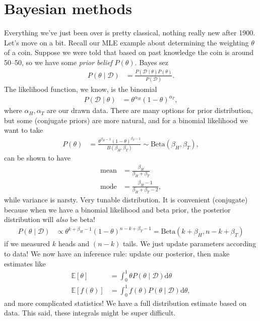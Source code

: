 \documentclass[11pt,letterpaper]{article}
\renewcommand{\d}{\mathrm{d}}
\theoremstyle{definition}
\theoremstyle{plain}
\numberwithin{equation}{section}
\numberwithin{figure}{section}
\begin{document}
\section{Bayesian methods}
Everything we've just been over is pretty classical, nothing really new after 1900. Let's move on a bit. Recall our MLE example about determining the weighting $\theta$ of a coin. Suppose we were told that based on past knowledge the coin is around 50--50, so we have some \emph{prior belief} $P(\theta)$. Bayes sez
%
\begin{align}
	P(\theta \mid \mathcal{D}) &= \frac{P(\mathcal{D}\mid \theta) P(\theta)}{P(\mathcal{D})}.
\end{align}
%
The likelihood function, we know, is the binomial
%
\begin{align}
	P(\mathcal{D} \mid \theta) &= \theta^{\alpha_H} (1- \theta)^{\alpha_T},
\end{align}
%
where $\alpha_H, \alpha_T$ are our drawn data. There are many options for prior distribution, but some (conjugate priors) are more natural, and for a binomial likelihood we want to take
%
\begin{align}
	P(\theta) &= \frac{\theta^{\beta_H - 1} (1-\theta)^{\beta_T-1}}{B(\beta_H,\beta_T)} \sim \mathrm{Beta}(\beta_H,\beta_T),
\end{align}
%
can be shown to have
%
\begin{align}
	\mathrm{mean} &= \frac{\beta_H}{\beta_H + \beta_T}\\
	\mathrm{mode} &= \frac{\beta_H - 1}{\beta_H + \beta_T - 2},
\end{align}
%
while variance is narsty. Very tunable distribution. It is convenient (conjugate) because when we have a binomial likelihood and beta prior, the posterior distribution will \emph{also} be beta! 
%
\begin{align}
	P(\theta\mid \mathcal{D}) &\propto \theta^{k+\beta_H-1} (1-\theta)^{n-k+\beta_T-1} = \mathrm{Beta}(k+\beta_H, n-k+\beta_T)
\end{align}
%
if we measured $k$ heads and $(n-k)$ tails. We just update parameters according to data! We now have an inference rule: update our posterior, then make estimates like
%
\begin{align}
	\mathbb{E}[\theta] &= \int_0^1 \theta P(\theta\mid\mathcal{D}) \d \theta\\
	\mathbb{E}[f(\theta)] &= \int_0^1 f(\theta) P(\theta\mid\mathcal{D}) \d \theta,
\end{align}
%
and more complicated statistics! We have a full distribution estimate based on data. This said, these integrals might be super difficult.
\end{document}
